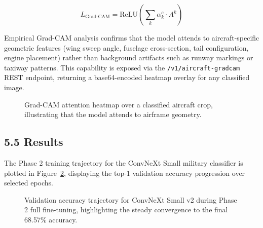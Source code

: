\documentclass[11pt,a4paper]{article}
\begin{document}
\[L_{\text{Grad-CAM}} = \text{ReLU}\left(\sum_k \alpha_k^c \cdot A^k\right) \tag{7}\]

Empirical Grad-CAM analysis confirms that the model attends to aircraft-specific geometric features (wing sweep angle, fuselage cross-section, tail configuration, engine placement) rather than background artifacts such as runway markings or taxiway patterns. This capability is exposed via the \texttt{/v1/aircraft-gradcam} REST endpoint, returning a base64-encoded heatmap overlay for any classified image.

\begin{figure}[htbp]
\centering
{}
\caption{Grad-CAM attention heatmap over a classified aircraft crop, illustrating that the model attends to airframe geometry.}
\label{fig:gradcam-example}
\end{figure}

\hypertarget{results-1}{%
\subsection{5.5 Results}\label{results-1}}

The Phase 2 training trajectory for the ConvNeXt Small military classifier is plotted in Figure~\ref{fig:aircraft-acc-curve}, displaying the top-1 validation accuracy progression over selected epochs.

\begin{figure}[htbp]
\centering
{}
\caption{Validation accuracy trajectory for ConvNeXt Small v2 during Phase 2 full fine-tuning, highlighting the steady convergence to the final 68.57\% accuracy.}
\label{fig:aircraft-acc-curve}
\end{figure}
\end{document}
